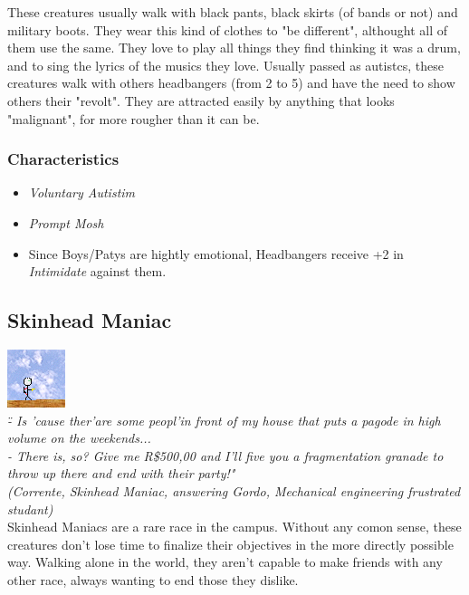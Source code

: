 \documentclass[ letterpaper,12pt]{article}
\begin{document}
These creatures usually walk with black pants, black skirts (of bands or not)
and military boots. They wear this kind of clothes to "be different", althought
all of them use the same. They love to play all things they find thinking it
was a drum, and to sing the lyrics of the musics they love. Usually passed as
autistcs, these creatures walk with others headbangers (from 2 to 5) and have
the need to show others their "revolt". They are attracted easily by anything
that looks "malignant", for more rougher than it can be.

\subsubsection{Characteristics}
\begin{itemize}
\item{{\it Voluntary Autistim}}
\item{{\it Prompt Mosh}}
\item{Since Boys/Patys are hightly emotional, Headbangers receive +2 in {\it Intimidate} against them.}
\end{itemize}

\subsection{Skinhead Maniac}
\includegraphics{../data/races/Img/skin.png}\\
{\it \" - Is 'cause ther'are some peopl'in front of my house that puts a pagode in high volume on the weekends...\\
 - There is, so? Give me R\$500,00 and I'll five you a fragmentation granade to throw up there and end with their party!"\\
(Corrente, Skinhead Maniac, answering Gordo, Mechanical engineering frustrated studant)}\\

Skinhead Maniacs are a rare race in the campus. Without any comon sense, these
creatures don't lose time to finalize their objectives in the more directly
possible way. Walking alone in the world, they aren't capable to make friends
with any other race, always wanting to end those they dislike.
\end{document}

